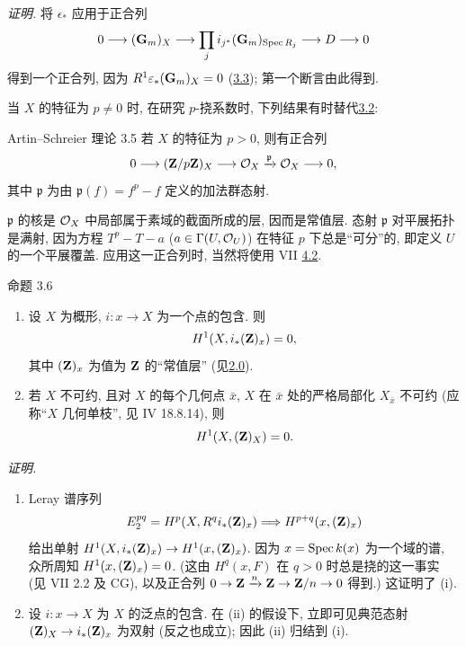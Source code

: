 \emph{证明.} 将 $\epsilon_*$ 应用于正合列
$$
0\to(\GG_m)_X\longrightarrow
\prod_j i_{j^{\ast}}(\GG_m)_{\Spec R_j}
\longrightarrow D\to0
$$
得到一个正合列, 因为 $R^1\varepsilon_*(\mathbf{G}_m)_X=0$
(\hyperref[IX.thm3.3]{3.3}); 第一个断言由此得到.

当 $X$ 的特征为 $p\neq0$ 时,
在研究 $p$-挠系数时, 下列结果有时替代\hyperref[IX.Thr3.2]{3.2}:

\begin{enonce*}{Artin--Schreier 理论 3.5}
若 $X$ 的特征为 $p>0$, 则有正合列
$$
0\to(\ZZ/p\ZZ)_X\to\Oo_X\xrightarrow{\mathfrak p}\Oo_X\to0{\quoi},
$$
其中 $\mathfrak p$ 为由 $\mathfrak p(f)=f^p-f$ 定义的加法群态射.
\end{enonce*}

$\mathfrak p$ 的核是 ${\mathcal O}_X$ 中局部属于素域的截面所成的层,
因而是常值层.
态射 $\mathfrak p$ 对平展拓扑是\pageoriginale 满射,
因为方程 $T^p-T-a$ ($a\in\Gamma(U,{\mathcal O}_U)$) 在特征 $p$ 下总是“可分”的,
即定义 $U$ 的一个平展覆盖.
应用这一正合列时, 当然将使用 VII \hyperref[VII.subsec4.2]{4.2}.

\begin{enonce*}{命题 3.6}
\begin{enumerate}
\renewcommand{\theenumi}{\roman{enumi}}
\renewcommand{\labelenumi}{(\theenumi)}
\item 设 $X$ 为概形, $i:x\to X$ 为一个点的包含.
则
$$
H^1(X,i_*(\mathbf{Z})_x)=0,
$$
其中 $(\mathbf{Z})_x$ 为值为 $\mathbf{Z}$ 的“常值层”
(见\hyperref[IX.subsec2.0]{2.0}).

\item 若 $X$ 不可约, 且对 $X$ 的每个几何点 $\bar x$,
$X$ 在 $\bar x$ 处的严格局部化 $X_{\bar x}$ 不可约
(应称“$X$ 几何单枝”, 见 \EGA IV 18.8.14), 则
$$
H^1(X,(\mathbf{Z})_X)=0{}.
$$
\end{enumerate}
\end{enonce*}

\emph{证明.}
\begin{enumerate}
\renewcommand{\theenumi}{\roman{enumi}}
\renewcommand{\labelenumi}{(\theenumi)}
\item Leray 谱序列
$$
E^{pq}_2=H^p(X,R^qi_*(\mathbf{Z})_x)\Longrightarrow
H^{p+q}(x,(\mathbf{Z})_x)
$$
给出单射 $H^1(X,i_*(\ZZ)_x)\to H^1(x,(\ZZ)_x)$.
因为 $x=\operatorname{Spec} k(x)$ 为一个域的谱,
众所周知 $H^1(x,(\mathbf{Z})_x)=0$.
(这由 $H^q(x,F)$ 在 $q>0$ 时总是挠的这一事实
(见 VII 2.2 及 CG),
以及正合列 $0\to\ZZ\xrightarrow{n}\ZZ\to\ZZ/n\to0$ 得到.)
这证明了 (i).

\item 设 $i:x\to X$ 为 $X$ 的泛点的包含.
在 (ii) 的假设下, 立即可见典范态射 $(\ZZ)_X\to i_*(\ZZ)_x$ 为双射
(反之也成立); 因此 (ii) 归结到 (i).
\end{enumerate}

